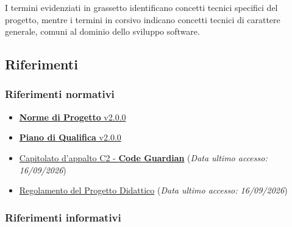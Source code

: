 \documentclass[12pt, a4paper]{article}
\begin{document}
I termini evidenziati in grassetto identificano concetti tecnici specifici del progetto, mentre i termini in corsivo indicano concetti tecnici di carattere generale, comuni al dominio dello sviluppo software.

\subsection{Riferimenti}

\subsubsection{Riferimenti normativi}

\begin{itemize}
\item
  \href{https://skynetunigroup.github.io/Code_Guardian/Documentazione/PB/norme_di_progetto_v2.0.0.pdf}{\textbf{Norme di Progetto} v2.0.0}
\item
  \href{https://skynetunigroup.github.io/Code_Guardian/Documentazione/PB/piano_di_qualifica_v2.0.0.pdf}{\textbf{Piano di Qualifica} v2.0.0}
\item
  \href{https://www.math.unipd.it/~tullio/IS-1/2025/Progetto/C2p.pdf}{Capitolato d'appalto C2 - \textbf{Code Guardian}} (\textit{Data ultimo accesso: 16/09/2026})
\item
  \href{https://www.math.unipd.it/~tullio/IS-1/2025/Dispense/PD1.pdf}{Regolamento del Progetto Didattico} (\textit{Data ultimo accesso: 16/09/2026})

\end{itemize}

\subsubsection{Riferimenti informativi}
\end{document}
